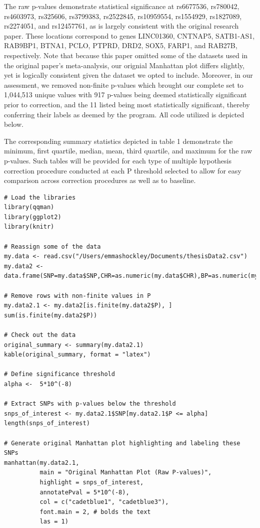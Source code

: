 \documentclass[12pt]{article}
\begin{document}
The raw p-values demonstrate statistical significance at rs6677536, rs780042, rs4603973, rs325606, rs3799383, rs2522845, rs10959554, rs1554929, rs1827089, rs2274051, and rs12457761, as is largely consistent with the original research paper. These locations correspond to genes LINC01360, CNTNAP5, SATB1-AS1, RAB9BP1, BTNA1, PCLO, PTPRD, DRD2, SOX5, FARP1, and RAB27B, respectively. Note that because this paper omitted some of the datasets used in the original paper's meta-analysis, our orignial Manhattan plot differs slightly, yet is logically consistent given the dataset we opted to include. Moreover, in our assessment, we removed non-finite p-values which brought our complete set to 1,044,513 unique values with 917 p-values being deemed statistically significant prior to correction, and the 11 listed being most statistically significant, thereby conferring their labels as deemed by the program. All code utilized is depicted below. \par

The corresponding summary statistics depicted in table 1 demonstrate the minimum, first quartile, median, mean, third quartile, and maximum for the raw p-values. Such tables will be provided for each type of multiple hypothesis correction procedure conducted at each P threshold selected to allow for easy comparison across correction procedures as well as to baseline. \par

\begin{lstlisting}[style=Rstyle]
# Load the libraries
library(qqman)
library(ggplot2)
library(knitr)

# Reassign some of the data
my.data <- read.csv("/Users/emmashockley/Documents/thesisData2.csv")
my.data2 <- data.frame(SNP=my.data$SNP,CHR=as.numeric(my.data$CHR),BP=as.numeric(my.data$BP),P=as.numeric(my.data$P))

# Remove rows with non-finite values in P
my.data2.1 <- my.data2[is.finite(my.data2$P), ]
sum(is.finite(my.data2$P))

# Check out the data
original_summary <- summary(my.data2.1)
kable(original_summary, format = "latex")

# Define significance threshold
alpha <-  5*10^(-8)

# Extract SNPs with p-values below the threshold
snps_of_interest <- my.data2.1$SNP[my.data2.1$P <= alpha]
length(snps_of_interest)

# Generate original Manhattan plot highlighting and labeling these SNPs
manhattan(my.data2.1, 
          main = "Original Manhattan Plot (Raw P-values)",
          highlight = snps_of_interest,
          annotatePval = 5*10^(-8),
          col = c("cadetblue1", "cadetblue3"),
          font.main = 2, # bolds the text
          las = 1) 
\end{lstlisting}
\clearpage
\end{document}
